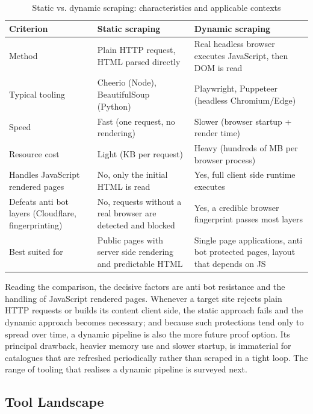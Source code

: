 \begin{table}[H]
  \caption{Static vs. dynamic scraping: characteristics and applicable contexts}
  \label{tab:scraping-approaches}
  \centering\small
  \begin{tabular}{|p{2.7cm}|p{5.0cm}|p{5.0cm}|}
    \hline
    \textbf{Criterion} & \textbf{Static scraping} & \textbf{Dynamic scraping} \\
    \hline
    Method & Plain HTTP request, HTML parsed directly & Real headless browser executes JavaScript, then DOM is read \\
    \hline
    Typical tooling & Cheerio (Node), BeautifulSoup (Python) & Playwright, Puppeteer (headless Chromium/Edge) \\
    \hline
    Speed & Fast (one request, no rendering) & Slower (browser startup + render time) \\
    \hline
    Resource cost & Light (KB per request) & Heavy (hundreds of MB per browser process) \\
    \hline
    Handles JavaScript rendered pages & No, only the initial HTML is read & Yes, full client side runtime executes \\
    \hline
    Defeats anti bot layers (Cloudflare, fingerprinting) & No, requests without a real browser are detected and blocked & Yes, a credible browser fingerprint passes most layers \\
    \hline
    Best suited for & Public pages with server side rendering and predictable HTML & Single page applications, anti bot protected pages, layout that depends on JS \\
    \hline
  \end{tabular}
\end{table}

Reading the comparison, the decisive factors are anti bot resistance and the handling of JavaScript rendered pages. Whenever a target site rejects plain HTTP requests or builds its content client side, the static approach fails and the dynamic approach becomes necessary; and because such protections tend only to spread over time, a dynamic pipeline is also the more future proof option. Its principal drawback, heavier memory use and slower startup, is immaterial for catalogues that are refreshed periodically rather than scraped in a tight loop. The range of tooling that realises a dynamic pipeline is surveyed next.

\subsection{Tool Landscape}

